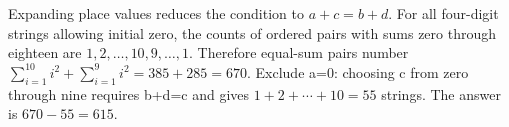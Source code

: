 Expanding place values reduces the condition to $a+c=b+d$. For all four-digit strings allowing initial zero, the counts of ordered pairs with sums zero through eighteen are $1,2,\ldots,10,9,\ldots,1$. Therefore equal-sum pairs number $\sum_{i=1}^{10}i^2+\sum_{i=1}^{9}i^2=385+285=670$. Exclude a=0: choosing c from zero through nine requires b+d=c and gives $1+2+\cdots+10=55$ strings. The answer is $670-55=\boxed{615}$.
